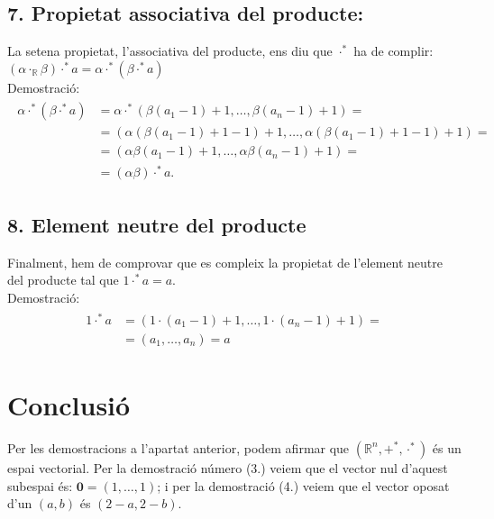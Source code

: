 \documentclass[a4paper, 9pt]{article}
\begin{document}
    \subsection*{7. Propietat associativa del producte:}
        La setena propietat, l'associativa del producte, ens diu que ${\cdot^*}$ ha de complir: ${(\alpha\cdot_{\mathbb{R}}\beta)\cdot^*a = \alpha\cdot^*(\beta\cdot^* a)}$\\
        Demostraci\'o:
        \begin{align}
            \begin{aligned}
                \alpha\cdot^*(\beta\cdot^*a) &= \alpha\cdot^*(\beta(a_1-1)+1,\dots,\beta(a_n-1)+1) =\\
                                             &= (\alpha(\beta(a_1-1)+1-1)+1,\dots,\alpha(\beta(a_1-1)+1-1)+1) =\\
                                             &= (\alpha\beta(a_1-1)+1,\dots,\alpha\beta(a_n-1)+1) =\\
                                             &= (\alpha\beta)\cdot^*a.
            \end{aligned}
        \end{align}

    \subsection*{8. Element neutre del producte}
        Finalment, hem de comprovar que es compleix la propietat de l'element neutre del producte tal que ${1\cdot^*a = a}$.\\
        Demostraci\'o:
        \begin{align*}
            \begin{aligned}
                1\cdot^*a &= (1\cdot(a_1-1)+1,\dots,1\cdot(a_n-1)+1) =\\
                          &= (a_1,\dots,a_n) = a
            \end{aligned}
        \end{align*}

    \section*{Conclusi\'o}
        Per les demostracions a l'apartat anterior, podem afirmar que ${(\mathbb{R}^n, +^*, \cdot^*)}$ \'es un espai vectorial. Per la demostraci\'o n\'umero (3.) veiem que el vector nul d'aquest subespai \'es: ${\mathbf{0} = (1,\dots,1)}$; i per la demostraci\'o (4.) veiem que el vector oposat d'un ${(a,b)}$ \'es ${(2-a,2-b)}$.
\end{document}
